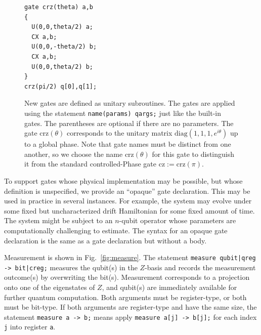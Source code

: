 \documentclass[USenglish,12pt,fleqn]{article} %
\newcommand*{\code}{\texttt}
\begin{document}
\begin{figure}
\hspace{.1\textwidth}
\begin{minipage}{.4\textwidth}

\end{minipage}

\hspace{.3\textwidth}
\begin{minipage}{.3\textwidth}
\begin{verbatim}
gate crz(theta) a,b
{
  U(0,0,theta/2) a;
  CX a,b;
  U(0,0,-theta/2) b;
  CX a,b;
  U(0,0,theta/2) b;
}
crz(pi/2) q[0],q[1];
\end{verbatim}
\end{minipage}

\caption{New gates are defined as unitary subroutines. The gates are applied using the statement \code{name(params) qargs;} just like the built-in gates. The parentheses are optional if there are no parameters. The gate $\mathrm{crz}(\theta)$ corresponds to the unitary matrix $\mathrm{diag}(1,1,1,e^{i\theta})$ up to a global phase. Note that gate names must be distinct from one another, so we choose the name $\mathrm{crz}(\theta)$ for this gate to distinguish it from the standard controlled-Phase gate $\mathrm{cz}:=\mathrm{crz}(\pi)$.
\label{fig:gate}}
\end{figure}

To support gates whose physical implementation may be possible, but whose definition is unspecified, we provide an ``opaque'' gate declaration. This may be used in practice in several instances. For example, the system may evolve under some fixed but uncharacterized drift Hamiltonian for some fixed amount of time. The system might be subject to an $n$-qubit operator whose parameters are computationally challenging to estimate. The syntax for an opaque gate declaration is the same as a gate declaration but without a body.

Measurement is shown in Fig.~\ref{fig:measure}. The statement \code{measure qubit|qreg -> bit|creg;} measures the qubit(s) in the $Z$-basis and records the measurement outcome(s) by overwriting the bit(s). Measurement corresponds to a projection onto one of the eigenstates of $Z$, and qubit(s) are immediately available for further quantum computation. Both arguments must be register-type, or both must be bit-type. If both arguments are register-type and have the same size, the statement \code{measure a -> b;} means apply \code{measure a[j] -> b[j];} for each index \code{j} into register \code{a}.
\end{document}
